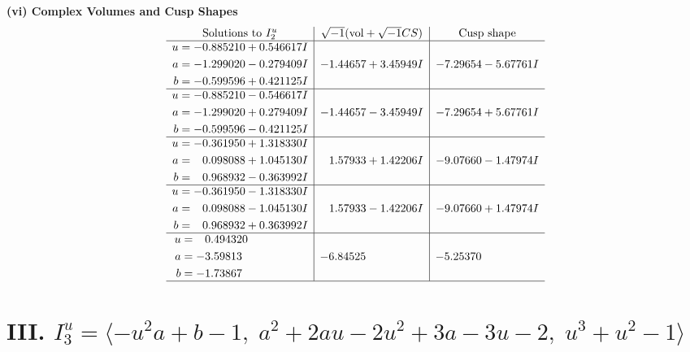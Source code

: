 \documentclass[1p]{elsarticle_modified}
\theoremstyle{definition}
\newcommand{\I}{\sqrt{-1}}
\begin{document}
\newpage\flushleft \textbf{(vi) Complex Volumes and Cusp Shapes}
$$\begin{array}{c|c|c}  
\text{Solutions to }I^u_{2}& \I (\text{vol} + \sqrt{-1}CS) & \text{Cusp shape}\\
 \hline 
\begin{aligned}
u &= -0.885210 + 0.546617 I \\
a &= -1.299020 - 0.279409 I \\
b &= -0.599596 + 0.421125 I\end{aligned}
 & -1.44657 + 3.45949 I & -7.29654 - 5.67761 I \\ \hline\begin{aligned}
u &= -0.885210 - 0.546617 I \\
a &= -1.299020 + 0.279409 I \\
b &= -0.599596 - 0.421125 I\end{aligned}
 & -1.44657 - 3.45949 I & -7.29654 + 5.67761 I \\ \hline\begin{aligned}
u &= -0.361950 + 1.318330 I \\
a &= \phantom{-}0.098088 + 1.045130 I \\
b &= \phantom{-}0.968932 - 0.363992 I\end{aligned}
 & \phantom{-}1.57933 + 1.42206 I & -9.07660 - 1.47974 I \\ \hline\begin{aligned}
u &= -0.361950 - 1.318330 I \\
a &= \phantom{-}0.098088 - 1.045130 I \\
b &= \phantom{-}0.968932 + 0.363992 I\end{aligned}
 & \phantom{-}1.57933 - 1.42206 I & -9.07660 + 1.47974 I \\ \hline\begin{aligned}
u &= \phantom{-}0.494320\phantom{ +0.000000I} \\
a &= -3.59813\phantom{ +0.000000I} \\
b &= -1.73867\phantom{ +0.000000I}\end{aligned}
 & -6.84525\phantom{ +0.000000I} & -5.25370\phantom{ +0.000000I}\\
 \hline 
 \end{array}$$\newpage\newpage\renewcommand{\arraystretch}{1}
\centering \section*{III. $I^u_{3}= \langle - u^2 a+b-1,\;a^2+2 a u-2 u^2+3 a-3 u-2,\;u^3+u^2-1 \rangle$}
\end{document}
